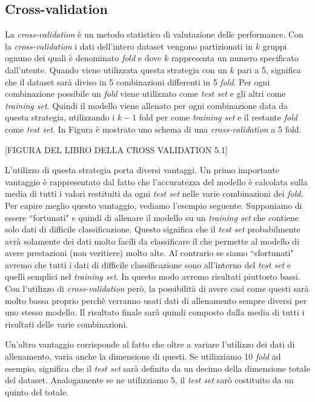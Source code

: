 \documentclass[12pt,italian]{report}
\begin{document}
\subsection{Cross-validation}
La \emph{cross-validation} è un metodo statistico di valutazione delle performance. Con la \emph{cross-validation} i dati dell'intero dataset vengono partizionati in $k$ gruppi ognuno dei quali è denominato \emph{fold} e dove $k$ rappresenta un numero specificato dall'utente. Quando viene utilizzata questa strategia con un $k$ pari a 5, significa che il dataset sarà diviso in 5 combinazioni differenti in 5 \emph{fold}. Per ogni combinazione possibile un \emph{fold} viene utilizzato come \emph{test set} e gli altri come \emph{training set}. Quindi il modello viene allenato per ogni combinazione data da questa strategia, utilizzando i $k-1$ fold per come \emph{training set} e il restante \emph{fold} come \emph{test set}. In Figura è mostrato uno schema di una \emph{cross-validation} a 5 fold.

[FIGURA DEL LIBRO DELLA CROSS VALIDATION 5.1]

L'utilizzo di questa strategia porta diversi vantaggi. Un primo importante vantaggio è rappresentato dal fatto che l'accuratezza del modello è calcolata sulla media di tutti i valori restituiti da ogni \emph{test set} nelle varie combinazioni dei \emph{fold}. Per capire meglio questo vantaggio, vediamo l'esempio seguente. Supponiamo di essere ``fortunati" e quindi di allenare il modello su un \emph{training set} che contiene solo dati di difficile classificazione. Questo significa che il \emph{test set} probabilmente avrà solamente dei dati molto facili da classificare il che permette al modello di avere prestazioni (non veritiere) molto alte. Al contrario se siamo ``sfortunati" avremo che tutti i dati di difficile classificazione sono all'interno del \emph{test set} e quelli semplici nel \emph{training set}. In questo modo avremo risultati piuttosto bassi.
Con l'utilizzo di \emph{cross-validation} però, la possibilità di avere casi come questi sarà molto bassa proprio perchè verranno usati dati di allenamento sempre diversi per uno stesso modello. Il risultato finale sarà quindi composto dalla media di tutti i risultati delle varie combinazioni.

Un'altro vantaggio corrisponde al fatto che oltre a variare l'utilizzo dei dati di allenamento, varia anche la dimensione di questi. Se utilizziamo 10 \emph{fold} ad esempio, significa che il \emph{test set} sarà definito da un decimo della dimensione totale del dataset. Analogamente se ne utilizziamo 5, il \emph{test set} sarò costituito da un quinto del totale.
\end{document}
